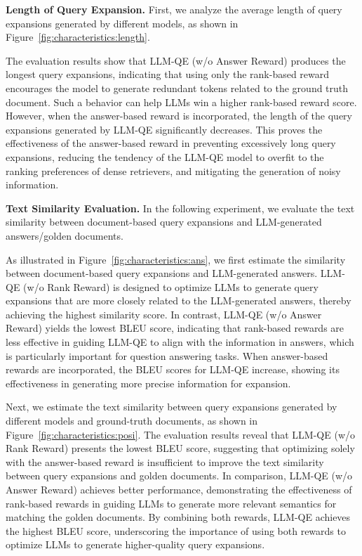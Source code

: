 \textbf{Length of Query Expansion.} First, we analyze the average length of query expansions generated by different models, as shown in Figure~\ref{fig:characteristics:length}.

The evaluation results show that LLM-QE (w/o Answer Reward) produces the longest query expansions, indicating that using only the rank-based reward encourages the model to generate redundant tokens related to the ground truth document. Such a behavior can help LLMs win a higher rank-based reward score. However, when the answer-based reward is incorporated, the length of the query expansions generated by LLM-QE significantly decreases. This proves the effectiveness of the answer-based reward in preventing excessively long query expansions, reducing the tendency of the LLM-QE model to overfit to the ranking preferences of dense retrievers, and mitigating the generation of noisy information.



\textbf{Text Similarity Evaluation.} In the following experiment, we evaluate the text similarity between document-based query expansions and LLM-generated answers/golden documents.

As illustrated in Figure~\ref{fig:characteristics:ans}, we first estimate the similarity between document-based query expansions and LLM-generated answers. LLM-QE (w/o Rank Reward) is designed to optimize LLMs to generate query expansions that are more closely related to the LLM-generated answers, thereby achieving the highest similarity score. In contrast, LLM-QE (w/o Answer Reward) yields the lowest BLEU score, indicating that rank-based rewards are less effective in guiding LLM-QE to align with the information in answers, which is particularly important for question answering tasks. When answer-based rewards are incorporated, the BLEU scores for LLM-QE increase, showing its effectiveness in generating more precise information for expansion.

Next, we estimate the text similarity between query expansions generated by different models and ground-truth documents, as shown in Figure~\ref{fig:characteristics:posi}. The evaluation results reveal that LLM-QE (w/o Rank Reward) presents the lowest BLEU score, suggesting that optimizing solely with the answer-based reward is insufficient to improve the text similarity between query expansions and golden documents. In comparison, LLM-QE (w/o Answer Reward) achieves better performance, demonstrating the effectiveness of rank-based rewards in guiding LLMs to generate more relevant semantics for matching the golden documents. By combining both rewards, LLM-QE achieves the highest BLEU score, underscoring the importance of using both rewards to optimize LLMs to generate higher-quality query expansions.


